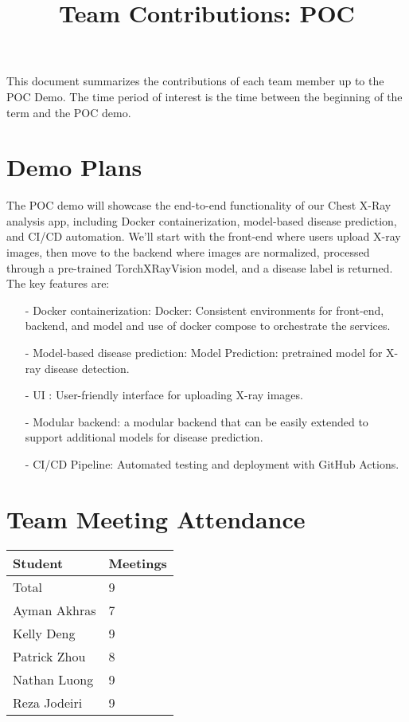 \documentclass{article}
\title{Team Contributions: POC\\\progname}
\author{\authname}
\date{}
\begin{document}
\maketitle

This document summarizes the contributions of each team member up to the POC
Demo.  The time period of interest is the time between the beginning of the term
and the POC demo.

\section{Demo Plans}

The POC demo will showcase the end-to-end functionality of our Chest X-Ray analysis app, including Docker containerization, model-based disease prediction, and CI/CD automation. We’ll start with the front-end where users upload X-ray images, then move to the backend where images are normalized, processed through a pre-trained TorchXRayVision model, and a disease label is returned. The key features are:
\begin{itemize}
    \item[-] Docker containerization: Docker: Consistent environments for front-end, backend, and model and use of docker compose to orchestrate the services.
    \item[-] Model-based disease prediction: Model Prediction: pretrained model for X-ray disease detection.
    \item[-] UI : User-friendly interface for uploading X-ray images.
    \item[-] Modular backend: a modular backend that can be easily extended to support additional models for disease prediction.
    \item[-] CI/CD Pipeline: Automated testing and deployment with GitHub Actions.
\end{itemize}

\section{Team Meeting Attendance}

\begin{table}[H]
\centering
\begin{tabular}{ll}
\toprule
\textbf{Student} & \textbf{Meetings}\\
\midrule
Total & 9\\
Ayman Akhras & 7\\
Kelly Deng & 9\\
Patrick Zhou  & 8\\
Nathan Luong & 9\\
Reza Jodeiri& 9\\
\bottomrule
\end{tabular}
\end{table}
\end{document}
